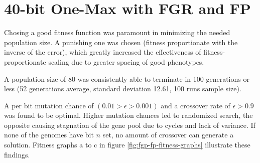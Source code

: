 \section{40-bit One-Max with FGR and FP}

Chosing a good fitness function was paramount in minimizing the needed population size. A punishing one was chosen (fitness proportionate with the inverse of the error), which greatly increased the effectiveness of fitness-proportionate scaling due to greater spacing of good phenotypes.

A population size of 80 was consistently able to terminate in 100 generations or less (52 generations average, standard deviation 12.61, 100 runs sample size).

A per bit mutation chance of $(0.01 > \epsilon > 0.001)$ and a crossover rate of $ \epsilon > 0.9 $ was found to be optimal. Higher mutation chances led to randomized search, the opposite causing stagnation of the gene pool due to cycles and lack of variance. If none of the genomes have bit $n$ set, no amount of crossover can generate a solution. Fitness graphs a to c in figure \ref{fig:fgp-fp-fitness-graphs} illustrate these findings.

